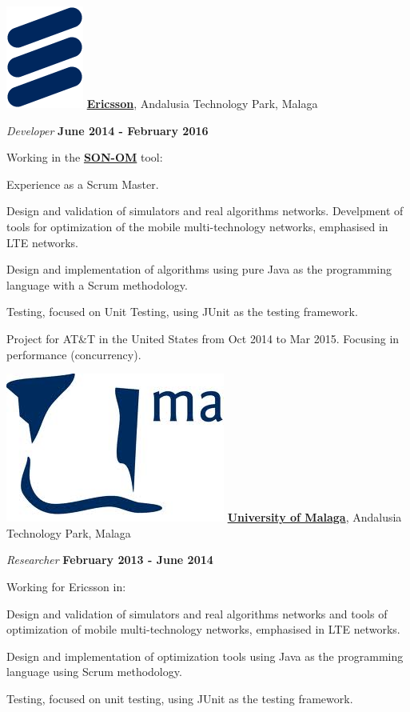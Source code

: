 \includegraphics[scale=0.3]{companies/ericsson2.png} \href{http://www.ericsson.com/}{\textbf{Ericsson}},
Andalusia Technology Park, Malaga
\begin{outerlist}
\item[] \textit{Developer}%
        \hfill \textbf{June 2014 - February 2016}

Working in the \href{http://www.ericsson.com/ourportfolio/products/son-optimization-manager}{\textbf{SON-OM}} tool:
\begin{innerlist}
\item Experience as a Scrum Master.
\item Design and validation of simulators and real algorithms networks. Develpment of tools for optimization of the mobile multi-technology networks, emphasised in LTE networks.
\item Design and implementation of algorithms using pure Java as the programming language with a Scrum methodology.
\item Testing, focused on Unit Testing, using JUnit as the testing framework.
\item Project for AT\&T in the United States from Oct 2014 to Mar 2015. Focusing in performance (concurrency).
\end{innerlist}
\end{outerlist}

\includegraphics[scale=0.2]{companies/uma.jpg} \href{http://www.uma.es/}{\textbf{University of Malaga}},
Andalusia Technology Park, Malaga
\begin{outerlist}
\item[] \textit{Researcher}%
        \hfill \textbf{February 2013 - June 2014}

Working for Ericsson in:
\begin{innerlist}
\item Design and validation of simulators and real algorithms networks and tools of optimization of mobile multi-technology networks, emphasised in LTE networks.
\item Design and implementation of optimization tools using Java as the programming language using Scrum methodology.
\item Testing, focused on unit testing, using JUnit as the testing framework.
\end{innerlist}
\end{outerlist}

